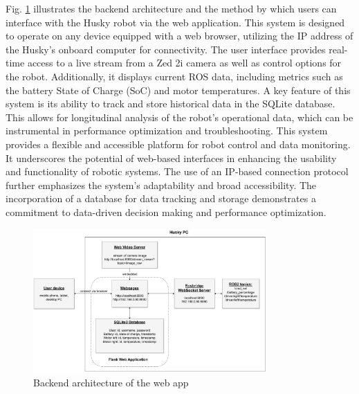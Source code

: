 \documentclass[conference]{IEEEtran}
\begin{document}
Fig. \ref{fig:userapp} illustrates the backend architecture and the method by which users can interface with the Husky robot via the web application. This system is designed to operate on any device equipped with a web browser, utilizing the IP address of the Husky's onboard computer for connectivity.
The user interface provides real-time access to a live stream from a Zed 2i camera as well as control options for the robot. Additionally, it displays current ROS data, including metrics such as the battery State of Charge (SoC) and motor temperatures.
A key feature of this system is its ability to track and store historical data in the SQLite database. This allows for longitudinal analysis of the robot's operational data, which can be instrumental in performance optimization and troubleshooting.
This system provides a flexible and accessible platform for robot control and data monitoring. It underscores the potential of web-based interfaces in enhancing the usability and functionality of robotic systems. 
The use of an IP-based connection protocol further emphasizes the system's adaptability and broad accessibility. The incorporation of a database for data tracking and storage demonstrates a commitment to data-driven decision making and performance optimization. 
\begin{figure}[htbp]
    \centerline{\includegraphics[width=8.9cm]{Pictures/userappbig.pdf}}
    \caption{Backend architecture of the web app}
    \label{fig:userapp}
\end{figure}
\end{document}
